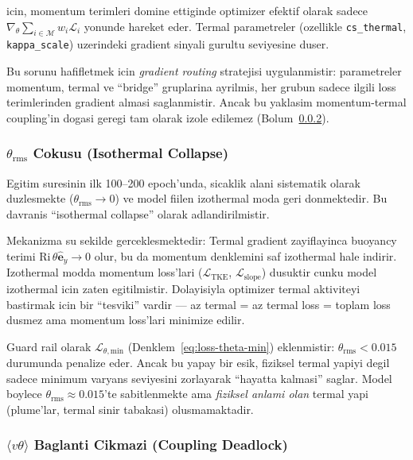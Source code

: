 \noindent icin, momentum terimleri domine ettiginde optimizer efektif olarak
sadece $\nabla_\theta \sum_{i \in \mathcal{M}} w_i \mathcal{L}_i$ yonunde
hareket eder. Termal parametreler (ozellikle \texttt{cs\_thermal},
\texttt{kappa\_scale}) uzerindeki gradient sinyali gurultu seviyesine duser.

Bu sorunu hafifletmek icin \emph{gradient routing} stratejisi uygulanmistir:
parametreler momentum, termal ve ``bridge'' gruplarina ayrilmis, her grubun
sadece ilgili loss terimlerinden gradient almasi saglanmistir. Ancak bu
yaklasim momentum-termal coupling'in dogasi geregi tam olarak izole edilemez
(Bolum~\ref{sec:vtheta-deadlock}).


\subsubsection{$\theta_\text{rms}$ Cokusu (Isothermal Collapse)}
\label{sec:theta-collapse}

Egitim suresinin ilk 100--200 epoch'unda, sicaklik alani sistematik olarak
duzlesmekte ($\theta_\text{rms} \to 0$) ve model fiilen izothermal moda
geri donmektedir. Bu davranis ``isothermal collapse'' olarak
adlandirilmistir.

Mekanizma su sekilde gerceklesmektedir: Termal gradient zayiflayinca
buoyancy terimi $\text{Ri}\,\theta\hat{\mathbf{e}}_y \to 0$ olur, bu da
momentum denklemini saf izothermal hale indirir. Izothermal modda momentum
loss'lari ($\mathcal{L}_\text{TKE}$, $\mathcal{L}_\text{slope}$) dusuktir
cunku model izothermal icin zaten egitilmistir. Dolayisiyla optimizer termal
aktiviteyi bastirmak icin bir ``tesviki'' vardir --- az termal = az
termal loss = toplam loss dusmez ama momentum loss'lari minimize edilir.

Guard rail olarak $\mathcal{L}_{\theta,\text{min}}$ (Denklem~\ref{eq:loss-theta-min})
eklenmistir: $\theta_\text{rms} < 0.015$ durumunda penalize eder. Ancak bu
yapay bir esik, fiziksel termal yapiyi degil sadece minimum varyans
seviyesini zorlayarak ``hayatta kalmasi'' saglar. Model boylece
$\theta_\text{rms} \approx 0.015$'te sabitlenmekte ama \emph{fiziksel anlami
olan} termal yapi (plume'lar, termal sinir tabakasi) olusmamaktadir.


\subsubsection{$\langle v\theta \rangle$ Baglanti Cikmazi (Coupling Deadlock)}
\label{sec:vtheta-deadlock}

